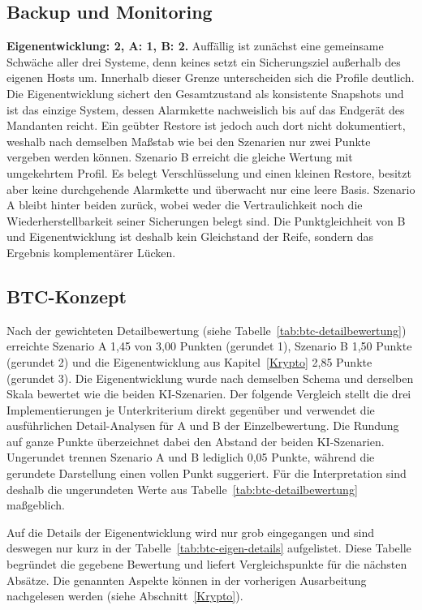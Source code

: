 \subsection{Backup und Monitoring}
\textbf{Eigenentwicklung: 2, A: 1, B: 2.} Auffällig ist zunächst eine gemeinsame Schwäche aller drei Systeme, denn keines setzt ein Sicherungsziel außerhalb des eigenen Hosts um. Innerhalb dieser Grenze unterscheiden sich die Profile deutlich. 
Die Eigenentwicklung sichert den Gesamtzustand als konsistente Snapshots und ist das einzige System, dessen Alarmkette nachweislich bis auf das Endgerät des Mandanten reicht. Ein geübter Restore ist jedoch auch dort nicht dokumentiert, weshalb nach demselben Maßstab wie bei den Szenarien nur zwei Punkte vergeben werden können. 
Szenario B erreicht die gleiche Wertung mit umgekehrtem Profil. Es belegt Verschlüsselung und einen kleinen Restore, besitzt aber keine durchgehende Alarmkette und überwacht nur eine leere Basis. 
Szenario A bleibt hinter beiden zurück, wobei weder die Vertraulichkeit noch die Wiederherstellbarkeit seiner Sicherungen belegt sind. Die Punktgleichheit von B und Eigenentwicklung ist deshalb kein Gleichstand der Reife, sondern das Ergebnis komplementärer Lücken.\cite{runbookA,selfauditA,backupscriptA,finalsummaryB,validatornotesB}

\subsection{\ac{BTC}-Konzept}
Nach der gewichteten Detailbewertung (siehe Tabelle~\ref{tab:btc-detailbewertung}) erreichte Szenario A 1{,}45 von 3{,}00 Punkten (gerundet 1), Szenario B 1{,}50 Punkte (gerundet 2) und die Eigenentwicklung aus Kapitel~\ref{Krypto} 2{,}85 Punkte (gerundet 3). 
Die Eigenentwicklung wurde nach demselben Schema und derselben Skala bewertet wie die beiden \ac{KI}-Szenarien. Der folgende Vergleich stellt die drei Implementierungen je Unterkriterium direkt gegenüber und verwendet die ausführlichen Detail-Analysen für A und B der Einzelbewertung.
Die Rundung auf ganze Punkte überzeichnet dabei den Abstand der beiden \ac{KI}-Szenarien. Ungerundet trennen Szenario A und B lediglich 0{,}05 Punkte, während die gerundete Darstellung einen vollen Punkt suggeriert. Für die Interpretation sind deshalb die ungerundeten Werte aus Tabelle~\ref{tab:btc-detailbewertung} maßgeblich.

Auf die Details der Eigenentwicklung wird nur grob eingegangen und sind deswegen nur kurz in der Tabelle~\ref{tab:btc-eigen-details} aufgelistet. Diese Tabelle begründet die gegebene Bewertung und liefert Vergleichspunkte für die nächsten Absätze. Die genannten Aspekte können in der vorherigen Ausarbeitung nachgelesen werden (siehe Abschnitt~\ref{Krypto}).


